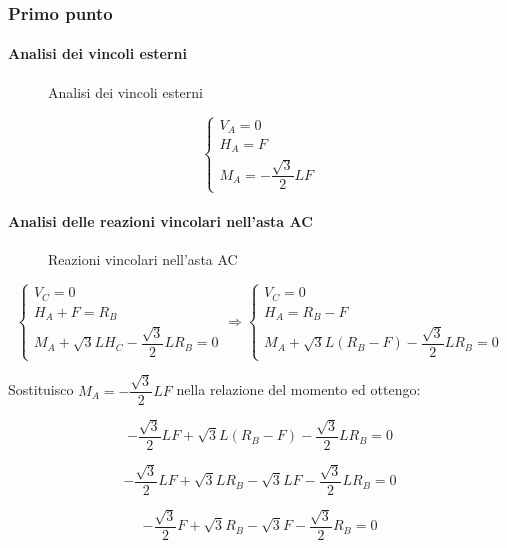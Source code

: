 \documentclass[main.tex]{subfiles}
\begin{document}
\subsubsection{Primo punto}

\paragraph{Analisi dei vincoli esterni}

\begin{figure}[H]
\centering
\resizebox{.5\textwidth}{!}{}
\caption{Analisi dei vincoli esterni}
\end{figure}

\[
\begin{cases}
V_A = 0\\
H_A = F\\
M_A = -\dfrac{\sqrt{3}}{2}LF
\end{cases}
\]

\paragraph{Analisi delle reazioni vincolari nell'asta AC}

\begin{figure}[H]
\centering
\resizebox{.5\textwidth}{!}{}
\caption{Reazioni vincolari nell'asta AC}
\end{figure}

\[
\begin{cases}
V_C = 0\\
H_A + F= R_B\\
M_A + \sqrt{3}LH_C - \dfrac{\sqrt{3}}{2}LR_B = 0
\end{cases}
\Longrightarrow
\begin{cases}
V_C = 0\\
H_A= R_B - F\\
M_A + \sqrt{3}L(R_B - F) - \dfrac{\sqrt{3}}{2}LR_B = 0
\end{cases}
\]

Sostituisco $M_A = -\dfrac{\sqrt{3}}{2}LF$ nella relazione del momento ed ottengo:

\[
	-\dfrac{\sqrt{3}}{2}LF + \sqrt{3}L(R_B - F) - \dfrac{\sqrt{3}}{2}LR_B = 0
\]

\[
	-\dfrac{\sqrt{3}}{2}LF + \sqrt{3}LR_B - \sqrt{3}LF - \dfrac{\sqrt{3}}{2}LR_B = 0
\]

\[
	-\dfrac{\sqrt{3}}{2}F + \sqrt{3}R_B - \sqrt{3}F - \dfrac{\sqrt{3}}{2}R_B = 0
\]
\end{document}
